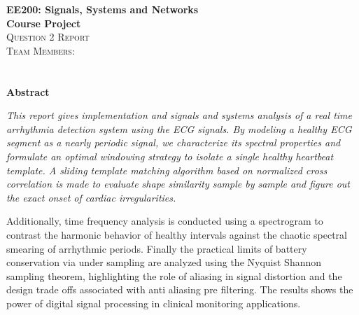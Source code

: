 \documentclass[10pt, a4paper]{article}
\begin{document}


  \begin{center}
    \vspace{2.0cm}
    {\LARGE \textbf{EE200: Signals, Systems and Networks}}\\[4pt]
    {\LARGE \textbf{Course Project}}\\[10pt]
    {\Large \textsc{Question 2 Report}}\\[40pt]

    \Large\textsc{Team Members:}\\[10pt]
    \\
    \\[90pt]

    \Large{\textbf{Abstract}}\\[15pt]
    \begin{minipage}{0.90\textwidth}
      \large\itshape\centering
      This report gives implementation and signals and systems analysis of a real time arrhythmia detection system using the ECG signals. By modeling a healthy ECG segment as a nearly periodic signal, we characterize its spectral properties and formulate an optimal windowing strategy to isolate a single healthy heartbeat template. A sliding template matching algorithm based on normalized cross correlation is made to evaluate shape similarity sample by sample and figure out the exact onset of cardiac irregularities. 
      
      Additionally, time frequency analysis is conducted using a spectrogram to contrast the harmonic behavior of healthy intervals against the chaotic spectral smearing of arrhythmic periods. Finally the practical limits of battery conservation via under sampling are analyzed using the Nyquist Shannon sampling theorem, highlighting the role of aliasing in signal distortion and the design trade offs associated with anti aliasing pre filtering. The results shows the power of digital signal processing in clinical monitoring applications.
    \end{minipage}\\[12pt]
   
    \vspace{0.2cm}
  \end{center}
\clearpage
\tableofcontents
\clearpage

\end{document}
